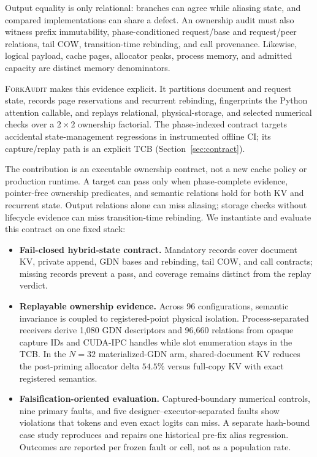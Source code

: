 \documentclass{article}
\newcommand{\method}{\textsc{ForkAudit}}
\begin{document}
Output equality is only relational: branches can agree while aliasing state,
and compared implementations can share a defect.  An ownership audit must also
witness prefix immutability, phase-conditioned request/base and request/peer
relations, tail COW, transition-time rebinding, and call provenance.  Likewise,
logical payload, cache pages, allocator peaks, process memory, and admitted
capacity are distinct memory denominators.

\method{} makes this evidence explicit.  It partitions document and request
state, records page reservations and recurrent rebinding, fingerprints the
Python attention callable, and replays relational, physical-storage, and
selected numerical checks over a $2\times2$ ownership factorial.  The
phase-indexed contract targets accidental state-management regressions in
instrumented offline CI; its capture/replay path is an explicit TCB
(Section~\ref{sec:contract}).

The contribution is an executable ownership contract, not a new cache policy
or production runtime.  A target can pass only when phase-complete evidence,
pointer-free ownership predicates, and semantic relations hold for both KV and
recurrent state.  Output relations alone can miss aliasing; storage checks
without lifecycle evidence can miss transition-time rebinding.  We instantiate
and evaluate this contract on one fixed stack:
\begin{itemize}
  \setlength{\itemsep}{1pt}
  \setlength{\parskip}{0pt}
  \item \textbf{Fail-closed hybrid-state contract.} Mandatory records cover
  document KV, private append, GDN bases and rebinding, tail COW, and call
  contracts; missing records prevent a pass, and coverage remains distinct
  from the replay verdict.
  \item \textbf{Replayable ownership evidence.} Across 96 configurations,
  semantic invariance is coupled to registered-point physical isolation.
  Process-separated receivers derive 1,080 GDN descriptors and 96,660 relations
  from opaque capture IDs and CUDA-IPC handles while slot enumeration stays in
  the TCB.  In the $N=32$ materialized-GDN arm, shared-document KV reduces the
  post-priming allocator delta $54.5\%$ versus full-copy KV with exact registered
  semantics.
  \item \textbf{Falsification-oriented evaluation.} Captured-boundary numerical
  controls, nine primary faults, and five designer--executor-separated faults
  show violations that tokens and even exact logits can miss.  A separate
  hash-bound case study reproduces and repairs one historical pre-fix alias
  regression.  Outcomes are reported per frozen fault or cell, not as a
  population rate.
\end{itemize}
\end{document}
